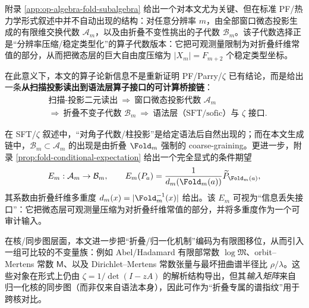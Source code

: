附录 \ref{app:op-algebra-fold-subalgebra} 给出一个对本文尤为关键、但在标准 PF/热力学形式叙述中并不自动出现的结构：对任意分辨率 $m$，由全部窗口微态投影生成的有限维交换代数 $\mathcal{A}_m$，以及由折叠不变性挑出的子代数 $\mathcal{B}_m$。该子代数选择正是“分辨率压缩/稳定类型化”的算子代数版本：它把可观测量限制为对折叠纤维常值的部分，从而把微态层的巨大自由度压缩为 $|X_m|=F_{m+2}$ 个稳定类型坐标。\par
在此意义下，本文的算子论新信息不是重新证明 PF/Parry/$\zeta$ 已有结论，而是给出一条\textbf{从扫描投影读出到语法层算子接口的可计算桥接链}：
\[
\begin{aligned}
&\text{扫描-投影二元读出}\ \Rightarrow\ \text{窗口微态投影代数 }\mathcal{A}_m\\
&\Rightarrow\ \text{折叠不变子代数 }\mathcal{B}_m\ \Rightarrow\ \text{语法层（SFT/sofic）与 }\zeta\text{ 接口}.
\end{aligned}
\]

\begin{remark}\label{rem:fold-new-invariants}
在 SFT/\(\zeta\) 叙述中，“对角子代数/柱投影”是给定语法后自然出现的；而在本文生成链中，\(\mathcal{B}_m\subset\mathcal{A}_m\) 的出现是由折叠 \(\Fold_m\) 强制的 coarse-graining。更进一步，附录 \ref{prop:fold-conditional-expectation} 给出一个完全显式的条件期望
\[
E_m:\mathcal{A}_m\to\mathcal{B}_m,\qquad
E_m(P_a)=\frac{1}{d_m(\Fold_m(a))}\widetilde P_{\Fold_m(a)},
\]
其系数由折叠纤维多重度 \(d_m(x)=|\Fold_m^{-1}(x)|\) 给出。该 \(E_m\) 可视为“信息丢失接口”：它把微态层可观测量压缩为对折叠纤维常值的部分，并将多重度作为一个可审计输入。

在核/同步图层面，本文进一步把“折叠/归一化机制”编码为有限图移位，从而引入一组可比较的不变量族：例如 Abel/Hadamard 有限部常数 \(\log\mathfrak{M}\)、orbit--Mertens 常数 \(\mathsf{M}\)、以及 Dirichlet--Mertens 常数张量与最坏扭曲谱半径比 \(\rho/\lambda\)。这些对象在形式上仍由 \(\zeta=1/\det(I-zA)\) 的解析结构导出，但其\emph{输入矩阵}来自归一化核的同步图（而非仅来自语法本身），因此可作为“折叠专属的谱指纹”用于跨核对比。
\end{remark}
